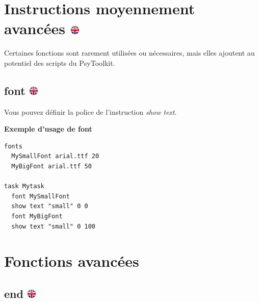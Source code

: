 \documentclass[
]{book}
\begin{document}
\hypertarget{instructions-moyennement-avancuxe9es}{%
\section[Instructions moyennement avancées ]{\texorpdfstring{Instructions moyennement avancées \href{https://www.psytoolkit.org/doc3.2.0/syntax.html\#_less_often_used_instructions}{\protect\includegraphics{img/ukflag.png}}}{Instructions moyennement avancées }}\label{instructions-moyennement-avancuxe9es}}

Certaines fonctions sont rarement utilisées ou nécessaires, mais elles ajoutent au potentiel des scripts du PsyToolkit.

\hypertarget{font}{%
\subsection[font ]{\texorpdfstring{font \href{https://www.psytoolkit.org/doc3.2.0/syntax.html\#font}{\protect\includegraphics{img/ukflag.png}}}{font }}\label{font}}

Vous pouvez définir la police de l'instruction \emph{show text}.

\textbf{Exemple d'usage de font}

\begin{verbatim}
fonts
  MySmallFont arial.ttf 20
  MyBigFont arial.ttf 50

task Mytask
  font MySmallFont
  show text "small" 0 0
  font MyBigFont
  show text "small" 0 100
\end{verbatim}

\hypertarget{s5-10}{%
\section{Fonctions avancées}\label{s5-10}}

\hypertarget{end}{%
\subsection[end ]{\texorpdfstring{end \href{https://www.psytoolkit.org/doc3.2.0/syntax.html\#task-end}{\protect\includegraphics{img/ukflag.png}}}{end }}\label{end}}
\end{document}
